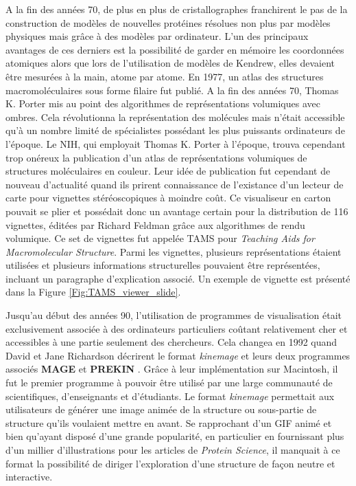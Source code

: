 A la fin des années 70, de plus en plus de cristallographes franchirent le pas de la construction de modèles de nouvelles protéines résolues non plus par modèles physiques mais grâce à des modèles par ordinateur. L'un des principaux avantages de ces derniers est la possibilité de garder en mémoire les coordonnées atomiques alors que lors de l'utilisation de modèles de Kendrew, elles devaient être mesurées à la main, atome par atome. En 1977, un atlas des structures macromoléculaires sous forme filaire fut publié. A la fin des années 70, Thomas K. Porter mis au point des algorithmes de représentations volumiques avec ombres. Cela révolutionna la représentation des molécules mais n'était accessible qu'à un nombre limité de spécialistes possédant les plus puissants ordinateurs de l'époque.
Le NIH, qui employait Thomas K. Porter à l'époque, trouva cependant trop onéreux la publication d'un atlas de représentations volumiques de structures moléculaires en couleur. Leur idée de publication fut cependant de nouveau d'actualité quand ils prirent connaissance de l'existance d'un lecteur de carte pour vignettes stéréoscopiques à moindre coût. Ce visualiseur en carton pouvait se plier et possédait donc un avantage certain pour la distribution de 116 vignettes, éditées par Richard Feldman grâce aux algorithmes de rendu volumique. Ce set de vignettes fut appelée TAMS pour \textit{Teaching Aids for Macromolecular Structure}. Parmi les vignettes, plusieurs représentations étaient utilisées et plusieurs informations structurelles pouvaient être représentées, incluant un paragraphe d'explication associé. Un exemple de vignette est présenté dans la Figure \ref{Fig:TAMS_viewer_slide}.


Jusqu'au début des années 90, l'utilisation de programmes de visualisation était exclusivement associée à des ordinateurs particuliers coûtant relativement cher et accessibles à une partie seulement des chercheurs. Cela changea en 1992 quand David et Jane Richardson décrirent le format \textit{kinemage} et leurs deux programmes associés \textbf{MAGE} et \textbf{PREKIN} \cite{richardson1992kinemage}. Grâce à leur implémentation sur Macintosh, il fut le premier programme à pouvoir être utilisé par une large communauté de scientifiques, d'enseignants et d'étudiants. Le format \textit{kinemage} permettait aux utilisateurs de générer une image animée de la structure ou sous-partie de structure qu'ils voulaient mettre en avant. Se rapprochant d'un GIF animé et bien qu'ayant disposé d'une grande popularité, en particulier en fournissant plus d'un millier d'illustrations pour les articles de \textit{Protein Science}, il manquait à ce format la possibilité de diriger l'exploration d'une structure de façon neutre et interactive.

